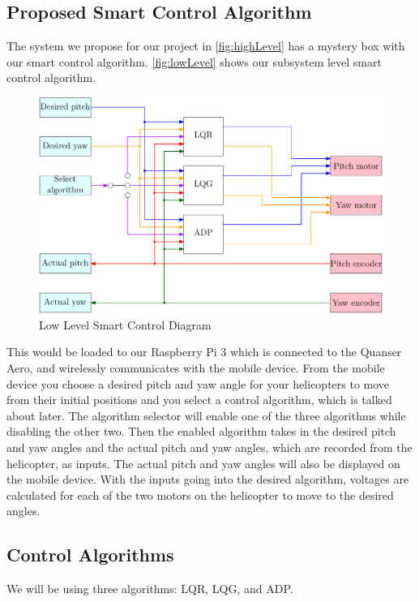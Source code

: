 \documentclass[letterpaper, 10pt, conference]{ieeeconf}
\begin{document}
\subsection{Proposed Smart Control Algorithm}
The system we propose for our project in \autoref{fig:highLevel} has a mystery box with our smart control algorithm.  \autoref{fig:lowLevel} shows our subsystem level smart control algorithm.  
\begin{figure}
  \centering
  \begin{mdframed}[backgroundcolor=yellow!20, roundcorner=7pt,outerlinewidth=1.2pt,outerlinecolor=blue!50]
  \includegraphics[scale=0.335]{figs/ipe/lowLevel}
  \end{mdframed}
  \caption{Low Level Smart Control Diagram}
  \label{fig:lowLevel}
\end{figure}
%
This would be loaded to our Raspberry Pi 3 which is connected to the Quanser Aero, and wirelessly communicates with the mobile device.  From the mobile device you choose a desired pitch and yaw angle for your helicopters to move from their initial positions and you select a control algorithm, which is talked about later.  The algorithm selector will enable one of the three algorithms while disabling the other two.  Then the enabled algorithm takes in the desired pitch and yaw angles and the actual pitch and yaw angles, which are recorded from the helicopter, as inputs.  The actual pitch and yaw angles will also be displayed on the mobile device.  With the inputs going into the desired algorithm, voltages are calculated for each of the two motors on the helicopter to move to the desired angles. 

\subsection{Control Algorithms} %
We will be using three algorithms: LQR, LQG, and ADP.
\end{document}
